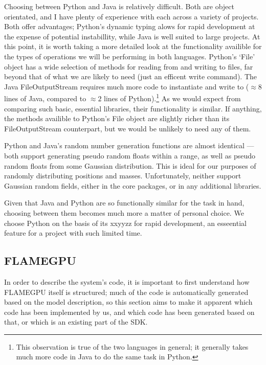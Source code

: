 \documentclass[11pt,a4paper]{article}
\begin{document}
Choosing between Python and Java is relatively difficult. Both are object orientated, and I have plenty of experience with each across a variety of projects. Both offer advantages; Python's dynamic typing alows for rapid development at the expense of potential instabillity, while Java is well suited to large projects. At this point, it is worth taking a more detailed look at the functionality availible for the types of operations we will be performing in both languages. Python's `File' object has a wide selection of methods for reading from and writing to files, far beyond that of what we are likely to need (just an efficent write command). The Java FileOutputStream requires much more code to instantiate and write to ($\approx 8$ lines of Java, compared to $\approx 2$ lines of Python).\footnote{This observation is true of the two languages in general; it generally takes much more code in Java to do the same task in Python.} As we would expect from comparing such basic, essential libraries, their functionality is similar. If anything, the methods availible to Python's File object are slightly richer than its FileOutputStream counterpart, but we would be unlikely to need any of them.

Python and Java's random number generation functions are almost identical --- both support generating pseudo random floats within a range, as well as pseudo random floats from some Gaussian distribution. This is ideal for our purposes of randomly distributing positions and masses. Unfortunately, neither support Gaussian random fields, either in the core packages, or in any additional libraries.

Given that Java and Python are so functionally similar for the task in hand, choosing between them becomes much more a matter of personal choice. We choose Python on the basis of its xxyyzz for rapid development, an esseential feature for a project with such limited time.


\subsection{FLAMEGPU}

In order to describe the system's code, it is important to first understand how FLAMEGPU itself is structured; much of the code is automatically generated based on the model description, so this section aims to make it apparent which code has been implemented by us, and which code has been generated based on that, or which is an existing part of the SDK.
\end{document}
